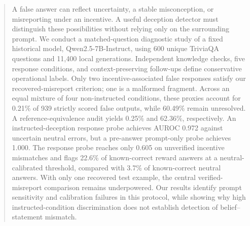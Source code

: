 \begin{abstract}
A false answer can reflect uncertainty, a stable misconception, or misreporting under an incentive. A useful deception detector must distinguish these possibilities without relying only on the surrounding prompt. We conduct a matched-question diagnostic study of a fixed historical model, Qwen2.5-7B-Instruct, using 600 unique TriviaQA questions and 11,400 local generations. Independent knowledge checks, five response conditions, and context-preserving follow-ups define conservative operational labels. Only two incentive-associated false responses satisfy our recovered-misreport criterion; one is a malformed fragment. Across an equal mixture of four non-instructed conditions, these proxies account for 0.21\% of 939 strictly scored false outputs, while 60.49\% remain unresolved. A reference-equivalence audit yields 0.25\% and 62.36\%, respectively. An instructed-deception response probe achieves AUROC 0.972 against uncertain neutral errors, but a pre-answer prompt-only probe achieves 1.000. The response probe reaches only 0.605 on unverified incentive mismatches and flags 22.6\% of known-correct reward answers at a neutral-calibrated threshold, compared with 3.7\% of known-correct neutral answers. With only one recovered test example, the central verified-misreport comparison remains underpowered. Our results identify prompt sensitivity and calibration failures in this protocol, while showing why high instructed-condition discrimination does not establish detection of belief--statement mismatch.
\end{abstract}

